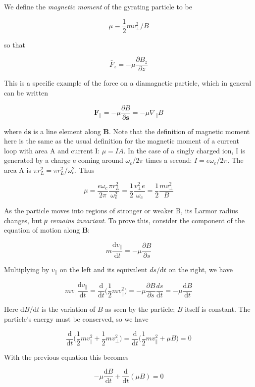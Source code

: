 \documentclass[
  notoc %
]{tufte-book}
\begin{document}
We define the \emph{magnetic moment} of the gyrating particle to be

\[
\mu \equiv \frac{1}{2}mv_\perp^2 / B
\]

so that

\[
\bar{F}_z = -\mu \frac{\partial B_z}{\partial z}
\]

This is a specific example of the force on a diamagnetic particle, which
in general can be written

\[
\mathbf{F}_\parallel = -\mu\frac{\partial B}{\partial \mathbf{s}} = -\mu\nabla_\parallel B
\]

where \(\mathrm{d}\mathbf{s}\) is a line element along \(\mathbf{B}\).
Note that the definition of magnetic moment here is the same as the
usual definition for the magnetic moment of a current loop with area A
and current I: \(\mu = IA\). In the case of a singly charged ion, I is
generated by a charge e coming around \(\omega_c / 2\pi\) times a
second: \(I = e\omega_c/2\pi\). The area A is
\(\pi r_L^2 = \pi r_L^2/\omega_c^2\). Thus

\[
\mu = \frac{e\omega_c}{2\pi}\frac{\pi r_L^2}{\omega_c^2} = \frac{1}{2}\frac{v_\perp^2 e}{\omega_c} = \frac{1}{2}\frac{mv_\perp^2}{B}
\]

As the particle moves into regions of stronger or weaker B, its Larmor
radius changes, but \emph{μ remains invariant}. To prove this, consider
the component of the equation of motion along \(\mathbf{B}\):

\[
m\frac{\mathrm{d}v_\parallel}{\mathrm{d}t} = -\mu \frac{\partial B}{\partial s}
\]

Multiplying by \(v_\parallel\) on the left and its equivalent
\(ds/\mathrm{d}t\) on the right, we have

\[
mv_\parallel \frac{\mathrm{d}v_\parallel}{\mathrm{d}t} = \frac{\mathrm{d}}{\mathrm{d}t}\Big( \frac{1}{2}mv_\parallel^2 \Big) = -\mu\frac{\partial B}{\partial s}\frac{ds}{\mathrm{d}t} = -\mu\frac{\mathrm{d}B}{\mathrm{d}t}
\]

Here \(\mathrm{d}B/\mathrm{d}t\) is the variation of \(B\) as seen by
the particle; \(B\) itself is constant. The particle's energy must be
conserved, so we have

\[
\frac{\mathrm{d}}{\mathrm{d}t}\Big( \frac{1}{2}mv_\parallel^2 + \frac{1}{2}mv_\perp^2 \Big) = \frac{\mathrm{d}}{\mathrm{d}t}\Big( \frac{1}{2}mv_\parallel^2 + \mu B \Big) = 0
\]

With the previous equation this becomes

\[
-\mu\frac{\mathrm{d}B}{\mathrm{d}t} + \frac{\mathrm{d}}{\mathrm{d}t}(\mu B) = 0
\]
\end{document}
